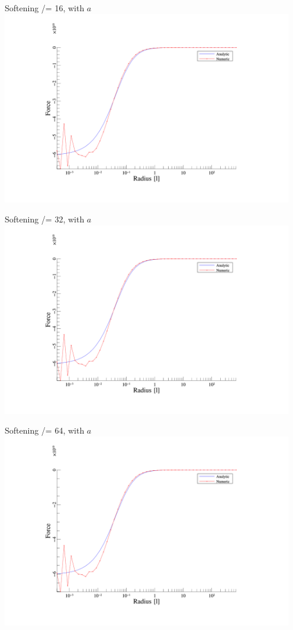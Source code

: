 \begin{frame}{Softening /= 16, with $a$}
	\includegraphics[width=0.95\textwidth]{figures/plots/forces_a_16.png}
\end{frame}

\begin{frame}{Softening /= 32, with $a$}
	\includegraphics[width=0.95\textwidth]{figures/plots/forces_a_32.png}
\end{frame}

\begin{frame}{Softening /= 64, with $a$}
	\includegraphics[width=0.95\textwidth]{figures/plots/forces_a_64.png}
\end{frame}

